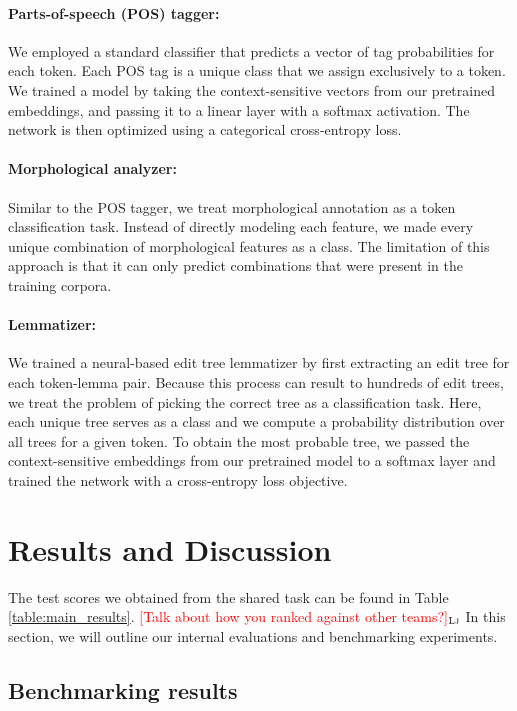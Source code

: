 \documentclass[11pt]{article}
\newcommand{\draftonly}[1]{#1}
\newcommand{\draftcomment}[3]{\draftonly{\textcolor{#2}{[#3]{$_{\textsc{#1}}$}}}}
\newcommand{\lj}[1]{\draftcomment{Lj}{red}{#1}}
\begin{document}
\paragraph{Parts-of-speech (POS) tagger:}
We employed a standard classifier that predicts a vector of tag probabilities for each token.
Each POS tag is a unique class that we assign exclusively to a token.
We trained a model by taking the context-sensitive vectors from our pretrained embeddings, and passing it to a linear layer with a softmax activation.
The network is then optimized using a categorical cross-entropy loss.

\paragraph{Morphological analyzer:}
Similar to the POS tagger, we treat morphological annotation as a token classification task.
Instead of directly modeling each feature, we made every unique combination of morphological features as a class.
The limitation of this approach is that it can only predict combinations that were present in the training corpora.

\paragraph{Lemmatizer:} 
We trained a neural-based edit tree lemmatizer \cite{muller-etal-2015-joint} by first extracting an edit tree for each token-lemma pair.
Because this process can result to hundreds of edit trees, we treat the problem of picking the correct tree as a classification task.
Here, each unique tree serves as a class and we compute a probability distribution over all trees for a given token.
To obtain the most probable tree, we passed the context-sensitive embeddings from our pretrained model to a softmax layer and trained the network with a cross-entropy loss objective.

\section{Results and Discussion}

The test scores we obtained from the shared task can be found in Table \ref{table:main_results}.
\lj{Talk about how you ranked against other teams?}
In this section, we will outline our internal evaluations and benchmarking experiments.


\subsection{Benchmarking results}
\label{sec:results_benchmarking}
\end{document}
